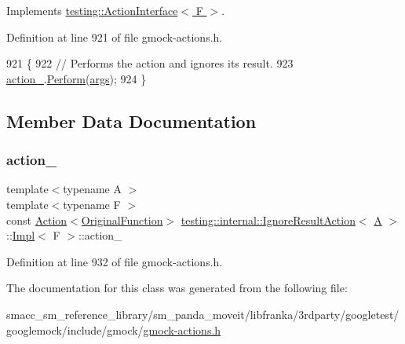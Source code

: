 Implements \hyperlink{classtesting_1_1ActionInterface_a20f8624fcea1786f2992b358760422a0}{testing\+::\+Action\+Interface$<$ F $>$}.



Definition at line 921 of file gmock-\/actions.\+h.


\begin{DoxyCode}
921                                                     \{
922       \textcolor{comment}{// Performs the action and ignores its result.}
923       \hyperlink{classtesting_1_1internal_1_1IgnoreResultAction_1_1Impl_a31db8189338e8f4d5f8e21e95c0b0763}{action\_}.\hyperlink{classtesting_1_1Action_ad00a03062885685da84b308e6e8ff4cb}{Perform}(\hyperlink{namespacegenerate__debs_a75f9143e38df82d83b2e8a6f99cae02c}{args});
924     \}
\end{DoxyCode}


\subsection{Member Data Documentation}
\mbox{\label{classtesting_1_1internal_1_1IgnoreResultAction_1_1Impl_a31db8189338e8f4d5f8e21e95c0b0763}} 
\subsubsection{\texorpdfstring{action\+\_\+}{action\_}}
{\footnotesize\ttfamily template$<$typename A $>$ \\
template$<$typename F $>$ \\
const \hyperlink{classtesting_1_1Action}{Action}$<$\hyperlink{classtesting_1_1internal_1_1IgnoreResultAction_1_1Impl_a00db745de37ebae1ee631240098bc2b1}{Original\+Function}$>$ \hyperlink{classtesting_1_1internal_1_1IgnoreResultAction}{testing\+::internal\+::\+Ignore\+Result\+Action}$<$ \hyperlink{namespacetesting_a5e9134d655d2fc9323902348083282e7}{A} $>$\+::\hyperlink{classtesting_1_1internal_1_1IgnoreResultAction_1_1Impl}{Impl}$<$ F $>$\+::action\+\_\+\hspace{0.3cm}{\ttfamily [private]}}



Definition at line 932 of file gmock-\/actions.\+h.



The documentation for this class was generated from the following file\+:\begin{DoxyCompactItemize}
\item 
smacc\+\_\+sm\+\_\+reference\+\_\+library/sm\+\_\+panda\+\_\+moveit/libfranka/3rdparty/googletest/googlemock/include/gmock/\hyperlink{gmock-actions_8h}{gmock-\/actions.\+h}\end{DoxyCompactItemize}
